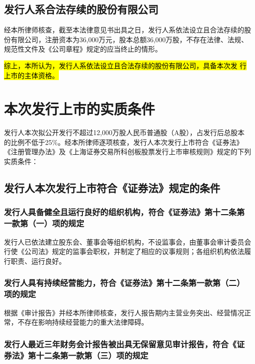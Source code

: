 \documentclass[zihao=-4]{ctexart}   %
\begin{document}
\subsection{发行人系合法存续的股份有限公司}

经本所律师核查，截至本法律意见书出具之日，发行人系依法设立且合法存续的股
份有限公司，注册资本为36,000万元，股本总额36,000万股，不存在法律、法规、
规范性文件及《公司章程》规定的应当终止的情形。

\hl{综上，本所认为，发行人系依法设立且合法存续的股份有限公司，具备本次发
行上市的主体资格。}

\section{本次发行上市的实质条件}

发行人本次拟公开发行不超过12,000万股人民币普通股（A股），占发行后总股本
的比例不低于25\%。经本所律师逐项核查，发行人本次发行上市符合《证券法》
《注册管理办法》及《上海证券交易所科创板股票发行上市审核规则》规定的下列
实质条件：

\subsection{发行人本次发行上市符合《证券法》规定的条件}

\subsubsection{发行人具备健全且运行良好的组织机构，符合《证券法》第十二条第一款第（一）项的规定}

发行人已依法建立股东会、董事会等组织机构，不设监事会，由董事会审计委员会
行使《公司法》规定的监事会职权，并制定了相应的议事规则；各组织机构依法履
行职责、运行良好。

\subsubsection{发行人具有持续经营能力，符合《证券法》第十二条第一款第（二）项的规定}

根据《审计报告》并经本所律师核查，发行人报告期内主营业务突出、经营情况正
常，不存在影响持续经营能力的重大法律障碍。

\subsubsection{发行人最近三年财务会计报告被出具无保留意见审计报告，符合《证券法》第十二条第一款第（三）项的规定}
\end{document}

